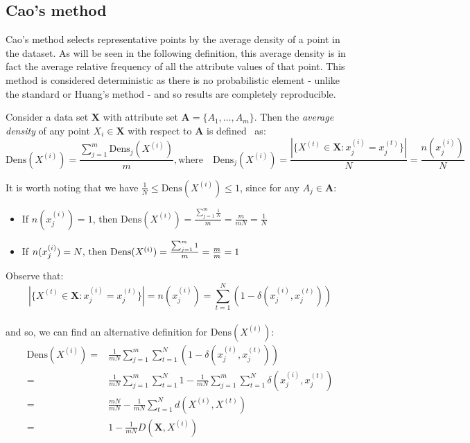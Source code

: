 \subsection{Cao's method}\label{subsection:cao}

Cao's method selects representative points by the average density of a point in
the dataset. As will be seen in the following definition, this average density 
is in fact the average relative frequency of all the attribute values of that 
point. This method is considered deterministic as there is no probabilistic 
element - unlike the standard or Huang's method - and so results are completely
reproducible.


\begin{definition}\label{def:density}	
    Consider a data set \(\textbf{X}\) with attribute set \(\textbf{A} = 
    \{A_1, \ldots, A_m\}\). Then the \emph{average density} of any point 
    \(X_i \in \textbf{X}\) with respect to \(\textbf{A}\) is 
    defined~\cite{Cao09} as:
	\[
	    \text{Dens}(X^{(i)}) = \frac{\sum_{j=1}^m \text{Dens}_{j}(X^{(i)})}{m}, 
        \text{where} \quad \text{Dens}_{j}(X^{(i)}) = \frac{|\{X^{(t)} \in 
        \textbf{X} : x_j^{(i)} = x_j^{(t)}\}|}{N} = \frac{n(x_j^{(i)})}{N}
	\]
\end{definition}

\begin{remark}
    It is worth noting that we have \(\frac{1}{N} \leq \text{Dens}(X^{(i)})
    \leq 1\), since for any \(A_j \in \textbf{A}\):		
	\begin{itemize}	
        \item If \(n(x_j^{(i)}) = 1\), then \(\text{Dens}(X^{(i)}) = 
			\frac{\sum_{j=1}^m \frac{1}{N}}{m} = \frac{m}{mN} = \frac{1}{N}\)
        \item If \(n(x_j^{(i)}) = N$, then $\text{Dens}(X^{(i)}) = 
            \frac{\sum_{j=1}^m 1}{m} = \frac{m}{m} = 1\)
	\end{itemize}
\end{remark}
    
Observe that:
\[
	|\{X^{(t)} \in \textbf{X} : x_j^{(i)} = x_j^{(t)}\}| = n(x_j^{(i)}) = 
	\sum_{t=1}^N (1 - \delta(x_j^{(i)}, x_j^{(t)}))
\]\\

and so, we can find an alternative definition for $\text{Dens}(X^{(i)})$:
\begin{equation}
\begin{aligned}
    \text{Dens}(X^{(i)}) = {} & {} \frac{1}{mN} \sum_{j=1}^m \sum_{t=1}^N 
                         (1 - \delta(x_j^{(i)}, x_j^{(t)}))
    \\
			             = {} & {} \frac{1}{mN} \sum_{j=1}^m \sum_{t=1}^N 1 - 
                         \frac{1}{mN} \sum_{j=1}^m \sum_{t=1}^N 
                         \delta(x_j^{(i)}, x_j^{(t)})
    \\
                         = {} & {} \frac{mN}{mN} - \frac{1}{mN} \sum_{t=1}^N 
                         d(X^{(i)}, X^{(t)})
    \\
			             = {} & {} 1 - \frac{1}{mN} D(\textbf{X}, X^{(i)})
\end{aligned}
\end{equation}\\

